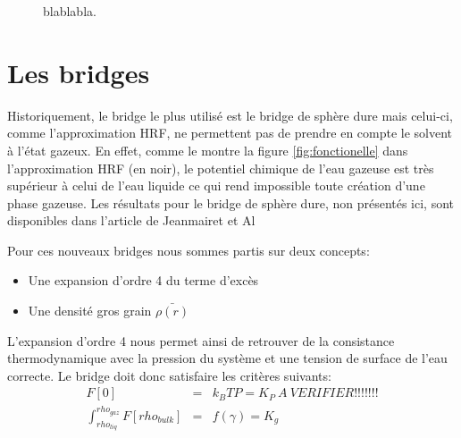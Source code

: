 \begin{figure}
  \center
    \caption{blablabla.}
    \label{fig:demouillage}
\end{figure}

\section{Les bridges}
Historiquement, le bridge le plus utilisé est le bridge de sphère dure mais celui-ci, comme l'approximation HRF, ne permettent pas de prendre en compte le solvent à l'état gazeux. En effet, comme le montre la figure \ref{fig:fonctionelle} dans l'approximation HRF (en noir), le potentiel chimique de l'eau gazeuse est très supérieur à celui de l'eau liquide ce qui rend impossible toute création d'une phase gazeuse. Les résultats pour le bridge de sphère dure, non présentés ici, sont disponibles dans l'article de Jeanmairet et Al\cite{jeanmairet_molecular_2013}

Pour ces nouveaux bridges nous sommes partis sur deux concepts:
\begin{itemize}
\item Une expansion d'ordre 4 du terme d'excès
\item Une densité gros grain $\bar{\rho(r)}$
\end{itemize}


L'expansion d'ordre 4 nous permet ainsi de retrouver de la consistance thermodynamique avec la pression du système et une tension de surface de l'eau correcte. Le bridge doit donc satisfaire les critères suivants:
\begin{eqnarray} \label{eq:bridge_criteres}
F[0]&=&k_BTP=K_P \ A \ VERIFIER !!!!!!!\\
\int_{rho_{liq}}^{rho_{gaz}} F[rho_{bulk}]&=&f(\gamma)=K_g
\end{eqnarray}

